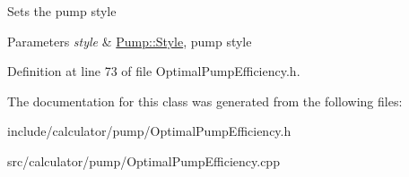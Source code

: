 Sets the pump style 
\begin{DoxyParams}{Parameters}
{\em style} & \hyperlink{class_pump_aef354601ce4218258cc898b35a1e90ff}{Pump\+::\+Style}, pump style \\
\hline
\end{DoxyParams}


Definition at line 73 of file Optimal\+Pump\+Efficiency.\+h.



The documentation for this class was generated from the following files\+:\begin{DoxyCompactItemize}
\item 
include/calculator/pump/Optimal\+Pump\+Efficiency.\+h\item 
src/calculator/pump/Optimal\+Pump\+Efficiency.\+cpp\end{DoxyCompactItemize}
